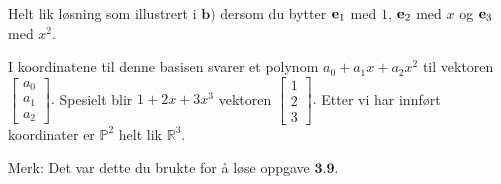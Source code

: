 \begin{losning}
\begin{punkt}
Helt lik løsning som illustrert i $\textbf{b)}$ dersom du bytter $\mathbf{e}_1$ med $1$, $\mathbf{e}_2$ med $x$ og $\mathbf{e}_3$ med $x^2$.
\end{punkt}

\begin{punkt}
I koordinatene til denne basisen svarer et polynom $a_0+a_1x+a_2x^2$ til vektoren $\begin{bmatrix}
a_0\\
a_1\\
a_2
\end{bmatrix}.$ Spesielt blir $1+2x+3x^3$ vektoren $\begin{bmatrix}
1\\
2\\
3
\end{bmatrix}.$ Etter vi har innført koordinater er $\mathbb{P}^2$ helt lik $\mathbb{R}^3$.


\noindent
Merk: Det var dette du brukte for å løse oppgave $\textbf{3.9.}$
\end{punkt}

\end{losning}



